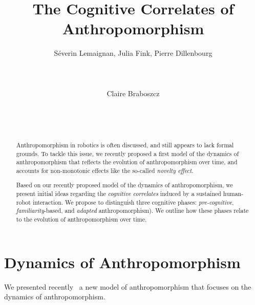\documentclass{sig-alternate-2013}
\begin{document}
\title{The Cognitive Correlates of Anthropomorphism}

\author{
\alignauthor
Séverin Lemaignan, Julia Fink, Pierre Dillenbourg\\
    \\
    \\
    \\
\alignauthor
Claire Braboszcz\\
    \\
    \\
    \\
}

\maketitle

\begin{abstract}

Anthropomorphism in robotics is often discussed, and still appears to lack
formal grounds. To tackle this issue, we recently proposed a first model of the
dynamics of anthropomorphism that reflects the evolution of anthropomorphism
over time, and accounts for non-monotonic effects like the so-called
\emph{novelty effect}.

Based on our recently proposed model of the dynamics of anthropomorphism, we
present initial ideas regarding the \emph{cognitive correlates} induced by a
sustained human-robot interaction. We propose to distinguish three cognitive
phases: \emph{pre-cognitive}, \emph{familiarity}-based, and \emph{adapted}
anthropomorphism). We outline how these phases relate to the evolution of
anthropomorphism over time.

\end{abstract}

\section{Dynamics of Anthropomorphism}
\label{sec:dynamics_model}

We presented recently~\cite{lemaignan2014dynamics} a new model of
anthropomorphism that focuses on the dynamics of anthropomorphism.
\end{document}
